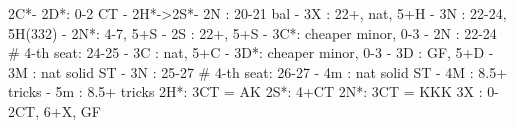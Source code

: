 2C*- 
2D*: 0-2 CT
   - 2H*->2S*- 2N : 20-21 bal
             - 3X : 22+, nat, 5+H
             - 3N : 22-24, 5H(332)
        - 2N*: 4-7, 5+S
   - 2S : 22+, 5+S
        - 3C*: cheaper minor, 0-3
   - 2N : 22-24  # 4-th seat: 24-25
   - 3C : nat, 5+C
        - 3D*: cheaper minor, 0-3
   - 3D : GF, 5+D
   - 3M : nat solid ST
   - 3N : 25-27  # 4-th seat: 26-27
   - 4m : nat solid ST
   - 4M : 8.5+ tricks
   - 5m : 8.5+ tricks
2H*: 3CT = AK
2S*: 4+CT
2N*: 3CT = KKK
3X : 0-2CT, 6+X, GF